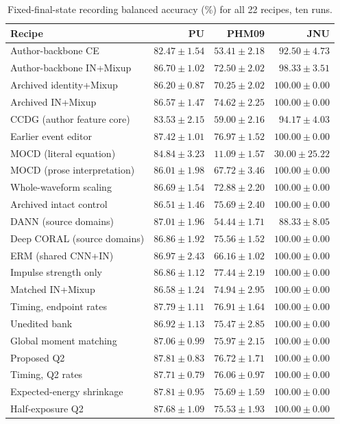 \begin{table}[pos=htbp]
\centering\footnotesize
\caption{Fixed-final-state recording balanced accuracy (\%) for all 22 recipes, ten runs.}
\label{tab:all-last-recording_ba}
\begin{tabular}{lrrr}
\toprule
Recipe & PU & PHM09 & JNU\\
\midrule
Author-backbone CE & $82.47\pm1.54$ & $53.41\pm2.18$ & $92.50\pm4.73$\\
Author-backbone IN+Mixup & $86.70\pm1.02$ & $72.50\pm2.02$ & $98.33\pm3.51$\\
Archived identity+Mixup & $86.20\pm0.87$ & $70.25\pm2.02$ & $100.00\pm0.00$\\
Archived IN+Mixup & $86.57\pm1.47$ & $74.62\pm2.25$ & $100.00\pm0.00$\\
CCDG (author feature core) & $83.53\pm2.15$ & $59.00\pm2.16$ & $94.17\pm4.03$\\
Earlier event editor & $87.42\pm1.01$ & $76.97\pm1.52$ & $100.00\pm0.00$\\
MOCD (literal equation) & $84.84\pm3.23$ & $11.09\pm1.57$ & $30.00\pm25.22$\\
MOCD (prose interpretation) & $86.01\pm1.98$ & $67.72\pm3.46$ & $100.00\pm0.00$\\
Whole-waveform scaling & $86.69\pm1.54$ & $72.88\pm2.20$ & $100.00\pm0.00$\\
Archived intact control & $86.51\pm1.46$ & $75.69\pm2.40$ & $100.00\pm0.00$\\
DANN (source domains) & $87.01\pm1.96$ & $54.44\pm1.71$ & $88.33\pm8.05$\\
Deep CORAL (source domains) & $86.86\pm1.92$ & $75.56\pm1.52$ & $100.00\pm0.00$\\
ERM (shared CNN+IN) & $86.97\pm2.43$ & $66.16\pm1.02$ & $100.00\pm0.00$\\
Impulse strength only & $86.86\pm1.12$ & $77.44\pm2.19$ & $100.00\pm0.00$\\
Matched IN+Mixup & $86.58\pm1.24$ & $74.94\pm2.95$ & $100.00\pm0.00$\\
Timing, endpoint rates & $87.79\pm1.11$ & $76.91\pm1.64$ & $100.00\pm0.00$\\
Unedited bank & $86.92\pm1.13$ & $75.47\pm2.85$ & $100.00\pm0.00$\\
Global moment matching & $87.06\pm0.99$ & $75.97\pm2.15$ & $100.00\pm0.00$\\
Proposed Q2 & $87.81\pm0.83$ & $76.72\pm1.71$ & $100.00\pm0.00$\\
Timing, Q2 rates & $87.71\pm0.79$ & $76.06\pm0.97$ & $100.00\pm0.00$\\
Expected-energy shrinkage & $87.81\pm0.95$ & $75.69\pm1.59$ & $100.00\pm0.00$\\
Half-exposure Q2 & $87.68\pm1.09$ & $75.53\pm1.93$ & $100.00\pm0.00$\\
\bottomrule
\end{tabular}
\end{table}
